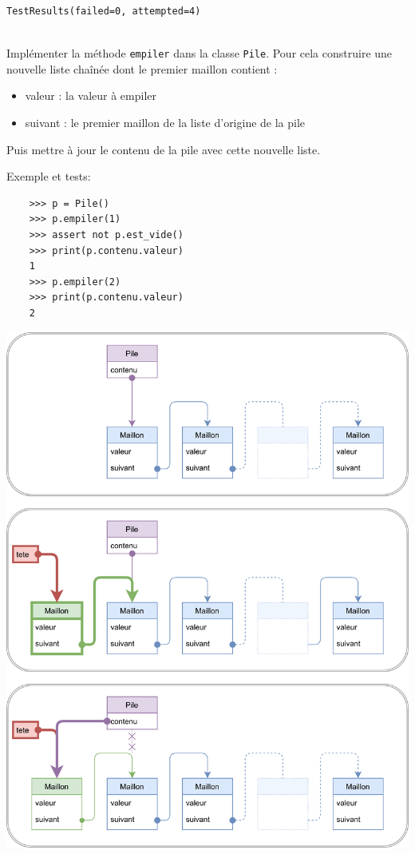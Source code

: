 \documentclass[a4paper,17pt]{extarticle}
\makeatletter
\let\origfigure\figure
\let\endorigfigure\endfigure
\renewenvironment{figure}[1][2] {
    \expandafter\origfigure\expandafter[H]
} {
    \endorigfigure
}
\newenvironment{eleve}%
{\begin{activite}\color{noiramu}\\[-0.5cm]}
{\end{activite}}
\providecommand{\tightlist}{%
      \setlength{\itemsep}{0pt}\setlength{\parskip}{0pt}}
\newcommand{\boxspacing}{\kern\kvtcb@left@rule\kern\kvtcb@boxsep}
\newcommand{\prompt}[4]{
        \ttfamily\llap{{\color{#2}[#3]:\hspace{3pt}#4}}\vspace{-\baselineskip}
    }
\makeatother
\begin{document}
            \begin{tcolorbox}[breakable, size=fbox, boxrule=.5pt, pad at break*=1mm, opacityfill=0]
\prompt{Out}{outcolor}{3}{\boxspacing}
\begin{Verbatim}[commandchars=\\\{\}]
TestResults(failed=0, attempted=4)
\end{Verbatim}
\end{tcolorbox}
        \begin{eleve}
    Implémenter la méthode \texttt{empiler} dans la classe \texttt{Pile}.
Pour cela construire une nouvelle liste chaînée dont le premier maillon
contient :

\begin{itemize}
\tightlist
\item
  valeur : la valeur à empiler
\item
  suivant : le premier maillon de la liste d'origine de la pile
\end{itemize}

Puis mettre à jour le contenu de la pile avec cette nouvelle liste.

Exemple et tests:

\begin{verbatim}
    >>> p = Pile()
    >>> p.empiler(1)
    >>> assert not p.est_vide()
    >>> print(p.contenu.valeur)
    1
    >>> p.empiler(2)
    >>> print(p.contenu.valeur)
    2
\end{verbatim}
        
        \end{eleve}
    \begin{figure}
\centering
\includegraphics{img-empiler.png}
\caption{Empiler un maillon}
\end{figure}
\end{document}

